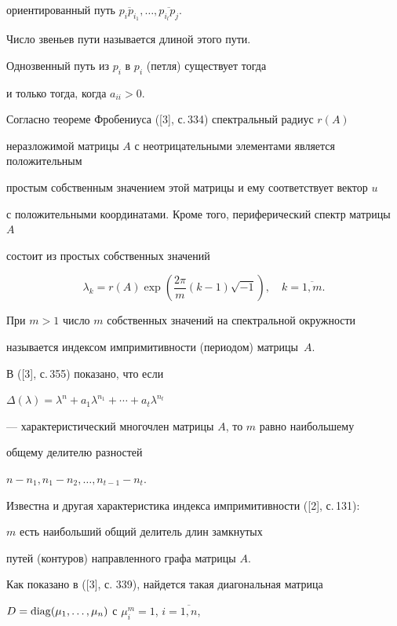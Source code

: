 ориентированный путь $\overline{p_i p_{i_1} },\dotsc,\overline{p_{i_l} p_j}$.


Число звеньев пути называется длиной этого пути.


Однозвенный путь из $p_i$ в $p_i$ (петля) существует тогда


и только тогда, когда $a_{ii}>0$.





Согласно теореме Фробениуса ([3], с.\,334) спектральный радиус $r(A)$


неразложимой матрицы $A$ с неотрицательными элементами является положительным 


простым собственным значением этой матрицы и ему соответствует вектор $u$


с положительными координатами. Кроме того, периферический спектр матрицы $A$


состоит из простых собственных значений	


\begin{equation}\label{1}


\lambda_k = r(A)\exp\left(\frac{2\pi}{m}(k-1)\sqrt{-1}\right),


\quad k = \overline{1,m}.  


\end{equation}


При $m > 1$ число $m$ собственных значений на спектральной окружности 


называется индексом импримитивности (периодом) матрицы~$A$. 


В ([3], с.\,355) показано, что если


$\Delta(\lambda) = \lambda^n + a_1 \lambda^{n_1} + \dotsb +a_t \lambda^{n_t}$


--- характеристический многочлен матрицы $A$, то $m$ равно наибольшему


общему делителю разностей


$n - n_1, n_1 - n_2,\dotsc, n_{t-1} - n_t$.


Известна и другая характеристика индекса импримитивности ([2], с.\,131): 


$m$ есть наибольший общий делитель длин замкнутых


путей (контуров) направленного графа матрицы $A$.





Как показано в ([3], с. 339), найдется такая диагональная матрица


$D=\operatorname{diag} (\mu_1,\dotsc,\mu_n)$ с $\mu^m_i = 1$, $i=\overline{1,n}$,


